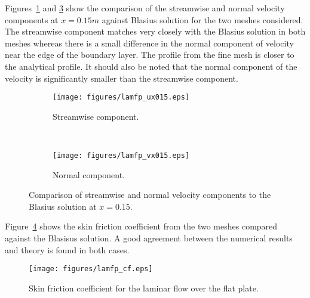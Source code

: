 Figures~\ref{fig:fpux15} and \ref{fig:fpvx15} show the comparison of the streamwise and normal velocity components at $x=0.15m$ against Blasius solution for the two meshes considered. The streamwise component matches very closely with the Blasius solution in both meshes whereas there is a small difference in the normal component of velocity near the edge of the boundary layer. The profile from the fine mesh is closer to the analytical profile. It should also be noted that the normal component of the velocity is significantly smaller than the streamwise component.
\begin{figure}[h!]
    \centering
    \captionsetup{justification=centering}
    \begin{subfigure}[b]{0.47\textwidth}
    \captionsetup{justification=centering}
        \texttt{[image: figures/lamfp\_ux015.eps]}
        \caption{Streamwise component.}
        \label{fig:fpux15}
    \end{subfigure}
    ~ %
    \begin{subfigure}[b]{0.47\textwidth}
    \centering
    \captionsetup{justification=centering}
        \texttt{[image: figures/lamfp\_vx015.eps]}
        \caption{Normal component.}
        \label{fig:fpvx15}
    \end{subfigure}
    \caption{Comparison of streamwise and normal velocity components to the Blasius solution at $x=0.15$.}
\end{figure}
Figure~\ref{fig:lfpcf} shows the skin friction coefficient from the two meshes compared against the Blasisus solution. A good agreement between the numerical results and theory is found in both cases.
\begin{figure}[h!]
    \centering
    \captionsetup{justification=centering}
    \texttt{[image: figures/lamfp\_cf.eps]}
    \caption{Skin friction coefficient for the laminar flow over the flat plate.}
     \label{fig:lfpcf}
\end{figure}

